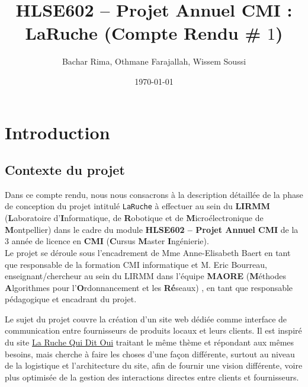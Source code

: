 \documentclass[a4paper,12pt]{book}
\title{\textbf{HLSE602 -- Projet Annuel CMI} : \textbf{LaRuche} (Compte Rendu \# $1$)}
\author{Bachar Rima, Othmane Farajallah, Wissem Soussi}
\date{\today}
\theoremstyle{break}
\theoremstyle{break}
\theoremstyle{definition}
\theoremstyle{remark}
\begin{document}
\pagestyle{plain}

\maketitle

{
  \hypersetup{linkcolor=black}
  \tableofcontents
}

\chapter{Introduction}
\section{Contexte du projet}
Dans ce compte rendu, nous nous consacrons à la description détaillée de la phase de conception du projet intitulé \texttt{LaRuche} à effectuer au sein du \textbf{LIRMM} (\textbf{L}aboratoire d'\textbf{I}nformatique, de \textbf{R}obotique et de \textbf{M}icroélectronique de \textbf{M}ontpellier) dans le cadre du module \textbf{HLSE602 -- Projet Annuel CMI} de la $3$\ieme{} année de licence en \textbf{CMI} (\textbf{C}ursus \textbf{M}aster \textbf{I}ngénierie).\\
Le projet se déroule sous l'encadrement de Mme Anne-Elisabeth Baert en tant que responsable de la formation CMI informatique et M. Eric Bourreau, enseignant/chercheur au sein du LIRMM dans l'équipe \textbf{MAORE} (\textbf{M}éthodes \textbf{A}lgorithmes pour l'\textbf{O}rdonnancement et les \textbf{Ré}seaux) \citep{EricBourreauPres}, en tant que responsable pédagogique et encadrant du projet.

Le sujet du projet couvre la création d'un site web dédiée comme interface de communication entre fournisseurs de produits locaux et leurs clients. Il est inspiré du site \href{https://laruchequiditoui.fr/fr}{La Ruche Qui Dit Oui} traitant le même thème et répondant aux mêmes besoins, mais cherche à faire les choses d'une façon différente, surtout au niveau de la logistique et l'architecture du site, afin de fournir une vision différente, voire plus optimisée de la gestion des interactions directes entre clients et fournisseurs.
\end{document}
